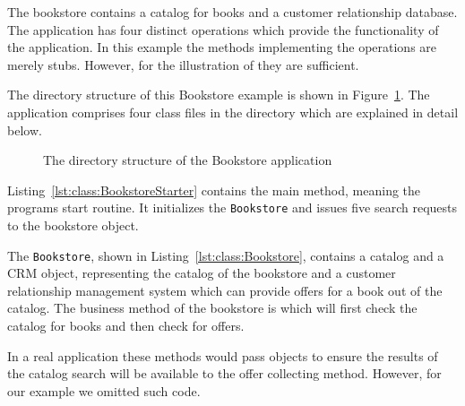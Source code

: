 \noindent The bookstore contains a catalog for books and a customer relationship database. The application has four distinct operations which provide the functionality of the application. In this example the methods implementing the operations are merely stubs. However, for the illustration of \Kieker{} they are sufficient.

The directory structure of this Bookstore example is shown in Figure~\ref{fig:PlainBookstoreExample}. The application comprises four class files in the  directory which are explained in detail below.

\begin{figure}[H]
\begin{graybox}
\end{graybox}

\caption{The directory structure of the Bookstore application}
\label{fig:PlainBookstoreExample}
\end{figure}

\noindent Listing~\ref{lst:class:BookstoreStarter} contains the main method, meaning the programs start routine. It initializes the \verb!Bookstore! and issues five search requests to the bookstore object.

\setJavaCodeListing



\noindent The \verb!Bookstore!, shown in Listing~\ref{lst:class:Bookstore}, contains a catalog and a CRM object, representing the catalog of the bookstore and a customer relationship management system which can provide offers for a book out of the catalog. The business method of the bookstore is  which will first check the catalog for books and then check for offers.

In a real application these methods would pass objects to ensure the results of the catalog search will be available to the offer collecting method. However, for our example we omitted such code. 



